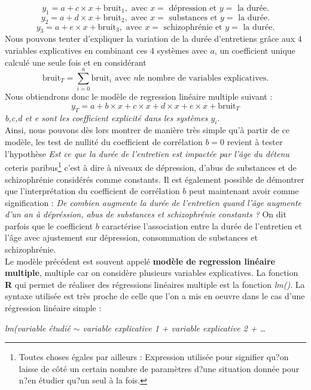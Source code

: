 $$ y_{1} = a + c\times x + \textrm{bruit}_{1}, \textrm{ avec } x = \textrm{ dépression et } y = \textrm{ la durée.}$$
$$ y_{2} = a +d\times x + \textrm{bruit}_{2}, \textrm{ avec } x = \textrm{ substances et } y = \textrm{ la durée.}$$
$$ y_{3} = a +e\times x + \textrm{bruit}_{3}, \textrm{ avec } x = \textrm{ schizophrénie et } y = \textrm{ la durée.}$$
Nous pouvons tenter d'expliquer la variation de la durée d'entretiens grâce aux $4$ variables explicatives en combinant ces $4$ systèmes avec $a$, un coefficient unique calculé une seule fois et en considérant 
$$\textrm{bruit}_{T} = \sum_{i=0}^{n} \textrm{bruit}_{i}\textrm{ avec } n \textrm{le nombre de variables explicatives.}$$
Nous obtiendrons donc le modèle de regression linéaire multiple suivant : 
$$ y_{T} = a + b\times x + c\times x + d\times x + e\times x + \textrm{bruit}_{T} $$ 
\textit{b,c,d et e sont les coefficient explicité dans les systèmes $y_{i}$}.\newline
\\
Ainsi, nous pouvons dès lors montrer de manière très simple qu'à partir de ce modèle, les test de nullité du coefficient de corrélation $b=0$ revient à tester l'hypothèse \textit{Est ce que la durée de l'entretien est impactée par l'âge du détenu} ceteris paribus\footnote{Toutes choses égales par ailleurs : Expression utilisée pour signifier qu?on laisse de côté un certain nombre de paramètres d?une situation donnée pour n?en étudier qu?un seul à la fois.} c'est à dire à niveaux de dépression, d'abus de substances et de schizophrénie considérés comme constants.\newline 
Il est également possible de démontrer que l'interprétation du coefficient de corrélation $b$ peut maintenant avoir comme signification : \textit{De combien augmente la durée de l'entretien quand l'âge augmente d'un an à dépréssion, abus de substances et schizophrénie constants ?}\newline 
On dit parfois que le coefficient $b$ caractérise l'association entre la durée de l'entretien et l'âge avec ajustement sur dépression, consommation de substances et schizophrénie.\newline 
\\
Le modèle précédent est souvent appelé \textbf{modèle de regression linéaire multiple}, multiple car on considère plusieurs variables explicatives. La fonction \textbf{R} qui permet de réaliser des régressions linéaires multiple est la fonction \textit{lm()}. La syntaxe utilisée est très proche de celle que l'on a mis en oeuvre dans le cas d'une régression linéaire simple : 
\begin{center}
\textit{lm(variable étudié $\sim$ variable explicative 1 + variable explicative 2 + \dots }
\end{center}

